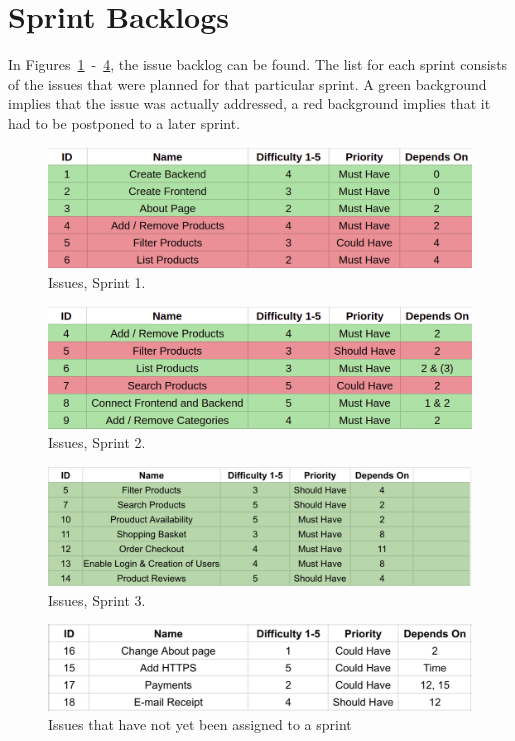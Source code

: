 \newpage

\section{Sprint Backlogs}

In Figures~\ref{fig:sprint_1}~-~\ref{fig:sprint_4}, the issue backlog can
be found. The list for each sprint consists of the issues that were planned
for that particular sprint. A green background implies that the issue was
actually addressed, a red background implies that it had to be postponed to
a later sprint.

\begin{figure}[H]
\centering
\includegraphics[width=\textwidth]{third_sprint/sprint_1.png}
\caption{\label{fig:sprint_1} Issues, Sprint 1.}
\end{figure}

\begin{figure}[H]
\centering
\includegraphics[width=\textwidth]{third_sprint/sprint_2.png}
\caption{\label{fig:sprint_2} Issues, Sprint 2.}
\end{figure}

\begin{figure}[H]
\centering
\includegraphics[width=\textwidth]{third_sprint/sprint_3_2.png}
\caption{\label{fig:sprint_3} Issues, Sprint 3.}
\end{figure}

\begin{figure}[H]
\centering
\includegraphics[width=\textwidth]{third_sprint/other2.png}
\caption{\label{fig:sprint_4} Issues that have not yet been assigned to
a sprint}
\end{figure}
